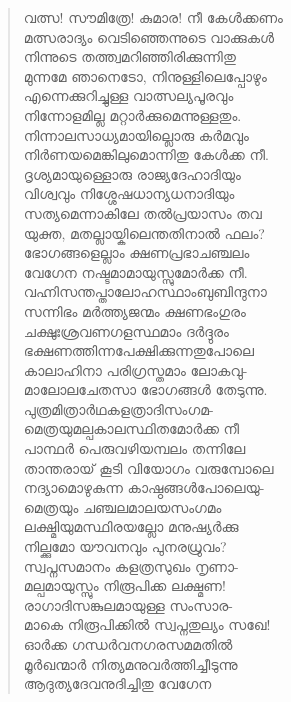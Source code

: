 \begin{verse}
വത്സ! സൗമിത്രേ! കുമാര! നീ കേള്‍ക്കണം\\
മത്സരാദ്യം വെടിഞ്ഞെന്നുടെ വാക്കുകള്‍\\
നിന്നുടെ തത്ത്വമറിഞ്ഞിരിക്കുന്നിതു\\
മുന്നമേ ഞാനെടോ, നിനുള്ളിലെപ്പോഴും\\
എന്നെക്കുറിച്ചുള്ള വാത്സല്യപൂരവും\\
നിന്നോളമില്ല മറ്റാര്‍ക്കുമെന്നുള്ളതും.\\
നിന്നാലസാധ്യമായില്ലൊരു കര്‍മവും\\
നിര്‍ണയമെങ്കിലുമൊന്നിതു കേള്‍ക്ക നീ.\\
ദൃശ്യമായുള്ളൊരു രാജ്യദേഹാദിയും\\
വിശ്വവും നിശ്ശേഷധാന്യധനാദിയും\\
സത്യമെന്നാകിലേ തല്‍പ്രയാസം തവ\\
യുക്ത, മതല്ലായ്കിലെന്തതിനാല്‍ ഫലം?\\
ഭോഗങ്ങളെല്ലാം ക്ഷണപ്രഭാചഞ്ചലം\\
വേഗേന നഷ്ടമാമായുസ്സുമോര്‍ക്ക നീ.\\
വഹ്നിസന്തപ്താലോഹസ്ഥാംബുബിന്ദുനാ\\
സന്നിഭം മര്‍ത്ത്യജന്മം ക്ഷണഭംഗുരം\\
ചക്ഷുഃശ്രവണഗളസ്ഥമാം ദര്‍ദ്ദുരം\\
ഭക്ഷണത്തിന്നപേക്ഷിക്കുന്നതുപോലെ\\
കാലാഹിനാ പരിഗ്രസ്തമാം ലോകവു-\\
മാലോലചേതസാ ഭോഗങ്ങള്‍ തേടുന്നു.\\
പുത്രമിത്രാര്‍ഥകളത്രാദിസംഗമ-\\
മെത്രയുമല്പകാലസ്ഥിതമോര്‍ക്ക നീ\\
പാന്ഥര്‍ പെരുവഴിയമ്പലം തന്നിലേ\\
താന്തരായ് കൂടി വിയോഗം വരുമ്പോലെ\\
നദ്യാമൊഴുകുന്ന കാഷ്ഠങ്ങള്‍പോലെയു-\\
മെത്രയും ചഞ്ചലമാലയസംഗമം\\
ലക്ഷ്മിയുമസ്ഥിരയല്ലോ മനുഷ്യര്‍ക്കു\\
നില്ക്കുമോ യൗവനവും പുനരധ്രുവം?\\
സ്വപ്നസമാനം കളത്രസുഖം നൃണാ-\\
മല്പമായുസ്സും നിരൂപിക്ക ലക്ഷ്മണ!\\
രാഗാദിസങ്കുലമായുള്ള സംസാര-\\
മാകെ നിരൂപിക്കില്‍ സ്വപ്നതുല്യം സഖേ!\\
ഓര്‍ക്ക ഗന്ധര്‍വനഗരസമമതില്‍\\
മൂര്‍ഖന്മാര്‍ നിത്യമനുവര്‍ത്തിച്ചീടുന്നു\\
ആദുത്യദേവനുദിച്ചിതു വേഗേന\\

\end{verse}
